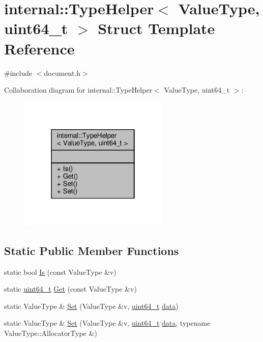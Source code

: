 \hypertarget{structinternal_1_1TypeHelper_3_01ValueType_00_01uint64__t_01_4}{}\section{internal\+:\+:Type\+Helper$<$ Value\+Type, uint64\+\_\+t $>$ Struct Template Reference}
\label{structinternal_1_1TypeHelper_3_01ValueType_00_01uint64__t_01_4}


{\ttfamily \#include $<$document.\+h$>$}



Collaboration diagram for internal\+:\+:Type\+Helper$<$ Value\+Type, uint64\+\_\+t $>$\+:
\nopagebreak
\begin{figure}[H]
\begin{center}
\leavevmode
\includegraphics[width=202pt]{structinternal_1_1TypeHelper_3_01ValueType_00_01uint64__t_01_4__coll__graph}
\end{center}
\end{figure}
\subsection*{Static Public Member Functions}
\begin{DoxyCompactItemize}
\item 
static bool \hyperlink{structinternal_1_1TypeHelper_3_01ValueType_00_01uint64__t_01_4_a4916651732ed27fa944c96a32cec5b88}{Is} (const Value\+Type \&v)
\item 
static \hyperlink{stdint_8h_aec6fcb673ff035718c238c8c9d544c47}{uint64\+\_\+t} \hyperlink{structinternal_1_1TypeHelper_3_01ValueType_00_01uint64__t_01_4_a1b1b2e4fe3c38fb37701284c6571ee92}{Get} (const Value\+Type \&v)
\item 
static Value\+Type \& \hyperlink{structinternal_1_1TypeHelper_3_01ValueType_00_01uint64__t_01_4_a38392035fe5a647078b24f0e15a84145}{Set} (Value\+Type \&v, \hyperlink{stdint_8h_aec6fcb673ff035718c238c8c9d544c47}{uint64\+\_\+t} \hyperlink{imgui__impl__opengl3__loader_8h_abd87654504355b4c1bb002dcb1d4d16a}{data})
\item 
static Value\+Type \& \hyperlink{structinternal_1_1TypeHelper_3_01ValueType_00_01uint64__t_01_4_a3c8b01c3e9a9e63c99bef2db9fdf3823}{Set} (Value\+Type \&v, \hyperlink{stdint_8h_aec6fcb673ff035718c238c8c9d544c47}{uint64\+\_\+t} \hyperlink{imgui__impl__opengl3__loader_8h_abd87654504355b4c1bb002dcb1d4d16a}{data}, typename Value\+Type\+::\+Allocator\+Type \&)
\end{DoxyCompactItemize}


